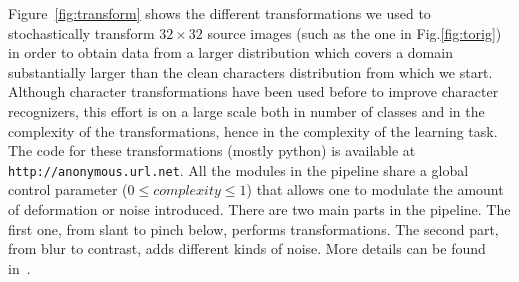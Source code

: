 \documentclass{article} %
\begin{document}
Figure~\ref{fig:transform} shows the different transformations we used to stochastically
transform $32 \times 32$ source images (such as the one in Fig.\ref{fig:torig})
in order to obtain data from a larger distribution which
covers a domain substantially larger than the clean characters distribution from
which we start.
Although character transformations have been used before to
improve character recognizers, this effort is on a large scale both
in number of classes and in the complexity of the transformations, hence
in the complexity of the learning task.
The code for these transformations (mostly python) is available at 
{\tt http://anonymous.url.net}. All the modules in the pipeline share
a global control parameter ($0 \le complexity \le 1$) that allows one to modulate the
amount of deformation or noise introduced. 
There are two main parts in the pipeline. The first one,
from slant to pinch below, performs transformations. The second
part, from blur to contrast, adds different kinds of noise.
More details can be found in~\citep{ift6266-tr-anonymous}.
\end{document}

